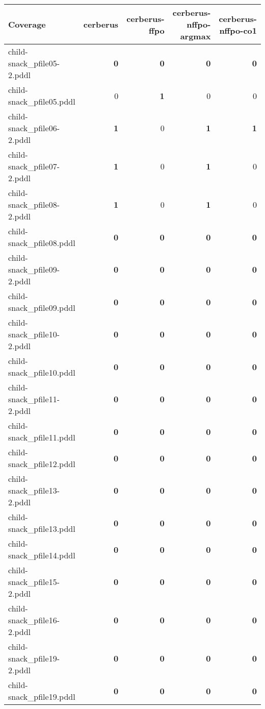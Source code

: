 \documentclass{article}
\begin{document}
\begin{tabular}{@{}lrrrr@{}}
Coverage & cerberus & cerberus-ffpo & cerberus-nffpo-argmax & cerberus-nffpo-co1 \\
\midrule
child-snack_pfile05-2.pddl & \textbf{0} & \textbf{0} & \textbf{0} & \textbf{0} \\
child-snack_pfile05.pddl & 0 & \textbf{1} & 0 & 0 \\
child-snack_pfile06-2.pddl & \textbf{1} & 0 & \textbf{1} & \textbf{1} \\
child-snack_pfile07-2.pddl & \textbf{1} & 0 & \textbf{1} & 0 \\
child-snack_pfile08-2.pddl & \textbf{1} & 0 & \textbf{1} & 0 \\
child-snack_pfile08.pddl & \textbf{0} & \textbf{0} & \textbf{0} & \textbf{0} \\
child-snack_pfile09-2.pddl & \textbf{0} & \textbf{0} & \textbf{0} & \textbf{0} \\
child-snack_pfile09.pddl & \textbf{0} & \textbf{0} & \textbf{0} & \textbf{0} \\
child-snack_pfile10-2.pddl & \textbf{0} & \textbf{0} & \textbf{0} & \textbf{0} \\
child-snack_pfile10.pddl & \textbf{0} & \textbf{0} & \textbf{0} & \textbf{0} \\
child-snack_pfile11-2.pddl & \textbf{0} & \textbf{0} & \textbf{0} & \textbf{0} \\
child-snack_pfile11.pddl & \textbf{0} & \textbf{0} & \textbf{0} & \textbf{0} \\
child-snack_pfile12.pddl & \textbf{0} & \textbf{0} & \textbf{0} & \textbf{0} \\
child-snack_pfile13-2.pddl & \textbf{0} & \textbf{0} & \textbf{0} & \textbf{0} \\
child-snack_pfile13.pddl & \textbf{0} & \textbf{0} & \textbf{0} & \textbf{0} \\
child-snack_pfile14.pddl & \textbf{0} & \textbf{0} & \textbf{0} & \textbf{0} \\
child-snack_pfile15-2.pddl & \textbf{0} & \textbf{0} & \textbf{0} & \textbf{0} \\
child-snack_pfile16-2.pddl & \textbf{0} & \textbf{0} & \textbf{0} & \textbf{0} \\
child-snack_pfile19-2.pddl & \textbf{0} & \textbf{0} & \textbf{0} & \textbf{0} \\
child-snack_pfile19.pddl & \textbf{0} & \textbf{0} & \textbf{0} & \textbf{0} \\
\end{tabular}
\end{document}
